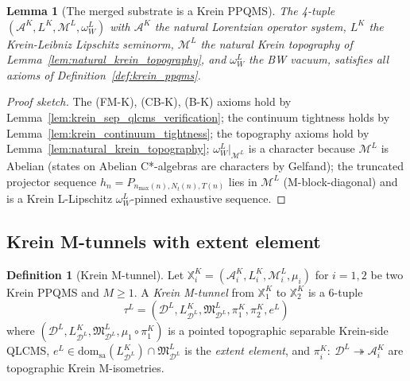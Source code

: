 \documentclass[11pt,a4paper]{article}
\theoremstyle{plain}
\newtheorem{lemma}[theorem]{Lemma}
\theoremstyle{definition}
\newtheorem{definition}[theorem]{Definition}
\newcommand{\nmax}{n_{\max}}
\newcommand{\Nt}{N_{t}}
\newcommand{\Acal}{\mathcal{A}}
\newcommand{\Mcal}{\mathcal{M}}
\newcommand{\Dcal}{\mathcal{D}}
\newcommand{\BWvac}{\omega_{W}^{L}}
\begin{document}
\begin{lemma}[The merged substrate is a Krein PPQMS]\label{lem:merged_substrate}
The 4-tuple $(\Acal^{K}, L^{K}, \Mcal^{L}, \BWvac)$ with $\Acal^{K}$
the natural Lorentzian operator system, $L^{K}$ the Krein-Leibniz
Lipschitz seminorm, $\Mcal^{L}$ the natural Krein topography of
Lemma~\ref{lem:natural_krein_topography}, and $\BWvac$ the BW vacuum,
satisfies all axioms of Definition~\ref{def:krein_ppqms}.
\end{lemma}

\begin{proof}[Proof sketch]
The (FM-K), (CB-K), (B-K) axioms hold by
Lemma~\ref{lem:krein_sep_qlcms_verification}; the continuum tightness
holds by Lemma~\ref{lem:krein_continuum_tightness}; the topography
axioms hold by Lemma~\ref{lem:natural_krein_topography};
$\BWvac|_{\Mcal^{L}}$ is a character because $\Mcal^{L}$ is Abelian
(states on Abelian C*-algebras are characters by Gelfand); the
truncated projector sequence $h_{n} = P_{\nmax(n), \Nt(n), T(n)}$ lies
in $\Mcal^{L}$ (M-block-diagonal) and is a Krein L-Lipschitz
$\BWvac$-pinned exhaustive sequence.
\end{proof}

\subsection{Krein M-tunnels with extent element}\label{sec:krein_mtunnels}

\begin{definition}[Krein M-tunnel]\label{def:krein_mtunnel}
Let $\mathbb{X}^{K}_{i} = (\Acal^{K}_{i}, L^{K}_{i}, \Mcal^{L}_{i},
\mu_{i})$ for $i = 1, 2$ be two Krein PPQMS and $M \ge 1$. A
\emph{Krein M-tunnel} from $\mathbb{X}^{K}_{1}$ to $\mathbb{X}^{K}_{2}$
is a 6-tuple
\[
\tau^{L} = (\Dcal^{L}, L_{\Dcal^{L}}^{K}, \mathfrak{M}_{\Dcal^{L}}^{L},
\pi_{1}^{K}, \pi_{2}^{K}, e^{L})
\]
where $(\Dcal^{L}, L_{\Dcal^{L}}^{K}, \mathfrak{M}_{\Dcal^{L}}^{L},
\mu_{1} \circ \pi_{1}^{K})$ is a pointed topographic separable
Krein-side QLCMS, $e^{L} \in \mathrm{dom}_{\mathrm{sa}}(L_{\Dcal^{L}}^{K})
\cap \mathfrak{M}_{\Dcal^{L}}^{L}$ is the \emph{extent element}, and
$\pi_{i}^{K} :\ \Dcal^{L} \twoheadrightarrow \Acal^{K}_{i}$ are
topographic Krein M-isometries.
\end{definition}
\end{document}

